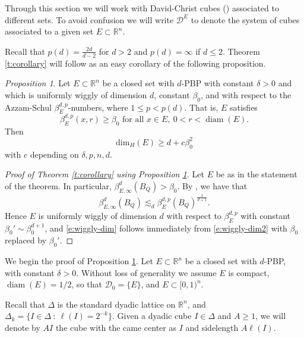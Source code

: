 \documentclass[11pt,reqno]{amsart}
\DeclareMathOperator{\diam}{diam}
\theoremstyle{definition}
\theoremstyle{remark}
\numberwithin{equation}{section}
\newcommand{\R}{\mathbb{R}}
\newcommand{\DD}{\mathcal{D}}
\theoremstyle{theorem}
\newtheorem{propo}[theorem]{Proposition}
\theoremstyle{definition}
\theoremstyle{remark}
\numberwithin{equation}{section}
\begin{document}
	Through this section we will work with David-Christ cubes () associated to different sets. To avoid confusion we will write $\DD^E$ to denote the system of cubes associated to a given set $E\subset\R^n$. 
	
	Recall that $p(d)=\tfrac{2d}{d-2}$ for $d>2$ and $p(d)=\infty$ if $d\le 2$. Theorem \ref{t:corollary} will follow as an easy corollary of the following proposition. 
	\begin{propo}\label{prop-content-beta-wiggly}
		Let $E \subset \R^n$ be a closed set with $d$-PBP with constant $\delta>0$ and which is uniformly wiggly of dimension $d$, constant $\beta_0$, and with respect to the Azzam-Schul $\beta_E^{d,p}$-numbers, where $1 \leq p < p(d)$. That is, $E$ satisfies 
		\begin{equation*}
			\beta_{E}^{d,p}(x,r) \geq \beta_0 \mbox{ for all } x\in E,\ 0<r<\diam(E).
		\end{equation*}
		Then
		\begin{equation}\label{e:wiggly-dim2}
		\mathrm{dim}_{H}(E) \geq d + c \beta_0^2
		\end{equation}
		with $c$ depending on $\delta,p,n,d$.
	\end{propo}
	\begin{proof}[Proof of Theorem \ref{t:corollary} using Proposition \ref{prop-content-beta-wiggly}]
		Let $E$ be as in the statement of the theorem. In particular, $\beta_{E, \infty}^d(B_Q) > \beta_0$. By \cite[Lemma 2.12, Lemma 2.13]{azzam2018analyst}, we have that
		\begin{equation*}
		\beta_{E,\infty}^d (B_Q) \lesssim_{d} \beta_{E}^{d,p}(B_Q)^{\frac{1}{d+1}}.
		\end{equation*}
		Hence $E$ is uniformly wiggly of dimension $d$ with respect to $\beta_{E}^{d,p}$ with constant $\beta_0'\sim\beta_0^{d+1}$, and \eqref{e:wiggly-dim} follows immediately from \eqref{e:wiggly-dim2} with $\beta_0$ replaced by $\beta_0'$.
	\end{proof}
	
	
	We begin the proof of Proposition \ref{prop-content-beta-wiggly}. Let $E \subset \R^n$ be a closed set with $d$-PBP, with constant $\delta>0$. Without loss of generality we assume $E$ is compact, $\diam(E)=1/2$, so that $\mathcal{D}_0=\{E\}$, and $E\subset [0,1)^n$.
	
	Recall that $\Delta$ is the standard dyadic lattice on $\R^n$, and $\Delta_k = \{I\in\Delta\ :\ \ell(I)=2^{-k}\}$. Given a dyadic cube $I\in\Delta$ and $A\ge 1$, we will denote by $AI$ the cube with the came center as $I$ and sidelength $A\ell(I)$.
%
%
%
%
%
%
%
%
	
\end{document}
